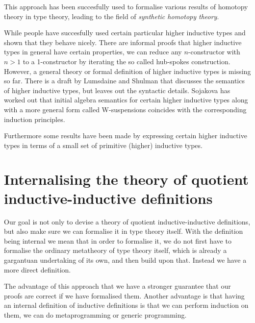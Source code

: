This approach has been succesfully used to formalise various results
of homotopy theory in type theory, leading to the field of
\emph{synthetic homotopy theory}.

While people have succesfully used certain particular higher inductive
types and shown that they behave nicely. There are informal proofs
that higher inductive types in general have certain properties, \eg we
can reduce any $n$-constructor with $n > 1$ to a 1-constructor by
iterating the so called hub-spokes construction. However, a general
theory or formal definition of higher inductive types is missing so
far. There is a draft by Lumsdaine and Shulman that discusses the
semantics of higher inductive types, but leaves out the syntactic
details. Sojakova has worked out that initial algebra semantics for
certain higher inductive types along with a more general form called
W-suspensions coincides with the corresponding induction principles.

Furthermore some results have been made by expressing certain higher
inductive types in terms of a small set of primitive (higher)
inductive types.


\section{Internalising the theory of quotient inductive-inductive definitions}

Our goal is not only to devise a theory of quotient
inductive-inductive definitions, but also make sure we can formalise
it in type theory itself. With the definition being internal we mean
that in order to formalise it, we do not first have to formalise the
ordinary metatheory of type theory itself, which is already a
gargantuan undertaking of its own, and then build upon that. Instead
we have a more direct definition.


The advantage of this approach that we have a stronger guarantee that
our proofs are correct if we have formalised them. Another advantage
is that having an internal definition of inductive definitions is that
we can perform induction on them, \ie we can do metaprogramming or
generic programming.

